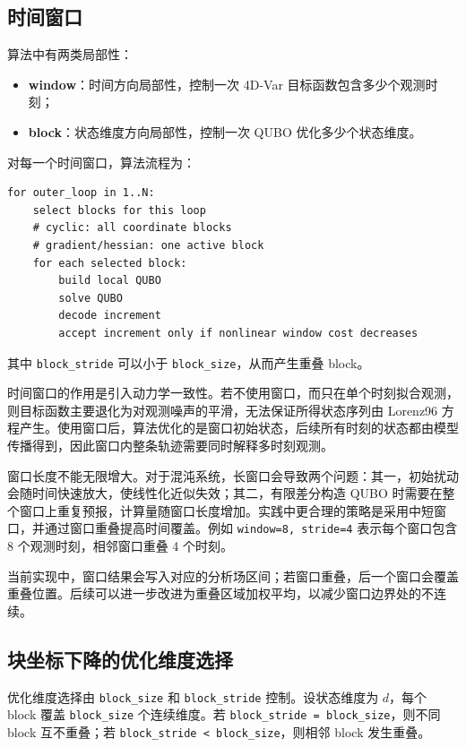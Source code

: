 \documentclass[UTF8,a4paper,12pt]{ctexart}
\begin{document}
\subsection{时间窗口}

算法中有两类局部性：

\begin{itemize}
  \item \textbf{window}：时间方向局部性，控制一次 4D-Var 目标函数包含多少个观测时刻；
  \item \textbf{block}：状态维度方向局部性，控制一次 QUBO 优化多少个状态维度。
\end{itemize}

对每一个时间窗口，算法流程为：
\begin{lstlisting}[style=cmd]
for outer_loop in 1..N:
    select blocks for this loop
    # cyclic: all coordinate blocks
    # gradient/hessian: one active block
    for each selected block:
        build local QUBO
        solve QUBO
        decode increment
        accept increment only if nonlinear window cost decreases
\end{lstlisting}

其中 \texttt{block\_stride} 可以小于 \texttt{block\_size}，从而产生重叠 block。

时间窗口的作用是引入动力学一致性。若不使用窗口，而只在单个时刻拟合观测，则目标函数主要退化为对观测噪声的平滑，无法保证所得状态序列由 Lorenz96 方程产生。使用窗口后，算法优化的是窗口初始状态，后续所有时刻的状态都由模型传播得到，因此窗口内整条轨迹需要同时解释多时刻观测。

窗口长度不能无限增大。对于混沌系统，长窗口会导致两个问题：其一，初始扰动会随时间快速放大，使线性化近似失效；其二，有限差分构造 QUBO 时需要在整个窗口上重复预报，计算量随窗口长度增加。实践中更合理的策略是采用中短窗口，并通过窗口重叠提高时间覆盖。例如 \texttt{window=8, stride=4} 表示每个窗口包含 8 个观测时刻，相邻窗口重叠 4 个时刻。

当前实现中，窗口结果会写入对应的分析场区间；若窗口重叠，后一个窗口会覆盖重叠位置。后续可以进一步改进为重叠区域加权平均，以减少窗口边界处的不连续。

\subsection{块坐标下降的优化维度选择}

优化维度选择由 \texttt{block\_size} 和 \texttt{block\_stride} 控制。设状态维度为 $d$，每个 block 覆盖 \texttt{block\_size} 个连续维度。若 \texttt{block\_stride = block\_size}，则不同 block 互不重叠；若 \texttt{block\_stride < block\_size}，则相邻 block 发生重叠。
\end{document}

